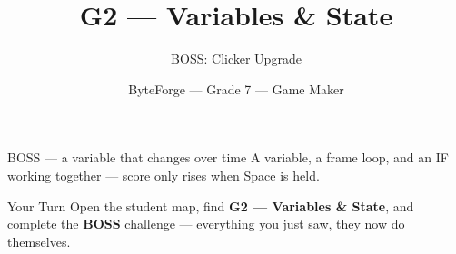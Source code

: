 \documentclass[aspectratio=169]{beamer}
\title{G2 — Variables \& State}
\subtitle{BOSS: Clicker Upgrade}
\author{ByteForge --- Grade 7 --- Game Maker}
\date{}
\begin{document}
\begin{frame}
    \titlepage
\end{frame}

\begin{frame}{BOSS — a variable that changes over time}
    \Large
    A variable, a frame loop, and an IF working together — score only rises when Space is held.
\end{frame}

\begin{frame}{Your Turn}
    \Large
    Open the student map, find \textbf{G2 — Variables \& State}, and complete
    the \textbf{BOSS} challenge --- everything you just saw, they now do themselves.
\end{frame}
\end{document}
